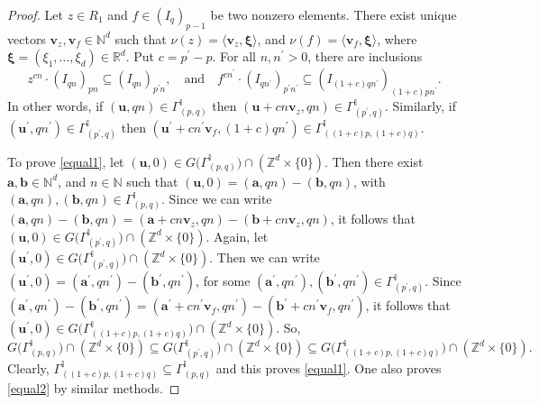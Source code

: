 \documentclass[12pt,a4paper]{amsart}
\theoremstyle{plain}
\theoremstyle{definition}
\numberwithin{equation}{theorem}
\begin{document}
\begin{proof}
Let $z\in R_1$ and $f\in {\left(I_{q}\right)}_{p-1}$ be two nonzero elements. There exist unique vectors $\mathbf{v}_z, \mathbf{v}_f \in \mathbb{N}^d$ such that $\nu(z) = \langle \mathbf{v}_z, \boldsymbol{\xi}\rangle$, and $\nu(f) = \langle \mathbf{v}_f, \boldsymbol{\xi}\rangle$, where $\boldsymbol{\xi}=(\xi_1,\ldots,\xi_d)\in \mathbb{R}^d$. Put $c=p^{\prime}-p$. For all $n,n^{\prime}>0$, there are inclusions $$z^{cn}\cdot {\left(I_{qn}\right)}_{pn} \subseteq {\left(I_{qn}\right)}_{p^{\prime}n}, \quad \text{and} \quad f^{cn^{\prime}}\cdot {\left(I_{qn^{\prime}}\right)}_{p^{\prime}n^{\prime}} \subseteq {\left(I_{(1+c)qn^{\prime}}\right)}_{(1+c)pn^{\prime}}.$$ In other words, if $(\mathbf{u},qn)\in \Gamma^{\mathbb{I}}_{(p,q)}$ then $(\mathbf{u}+cn\mathbf{v}_z,qn)\in \Gamma^{\mathbb{I}}_{(p^{\prime},q)}$. Similarly, if $(\mathbf{u}^{\prime},qn^{\prime})\in \Gamma^{\mathbb{I}}_{(p^{\prime},q)}$ then $(\mathbf{u}^{\prime}+cn^{\prime}\mathbf{v}_f,(1+c)qn^{\prime})\in \Gamma^{\mathbb{I}}_{\left((1+c)p,(1+c)q\right)}$.

To prove \eqref{equal1}, let $\left(\mathbf{u},0\right) \in G\big(\Gamma^{\mathbb{I}}_{(p,q)}\big) \cap \left(\mathbb{Z}^d\times \{0\}\right)$. Then there exist $\mathbf{a},\mathbf{b}\in \mathbb{N}^d$, and $n\in\mathbb{N}$ such that $\left(\mathbf{u},0\right) = (\mathbf{a},qn) - (\mathbf{b},qn)$, with $(\mathbf{a},qn), (\mathbf{b},qn) \in \Gamma^{\mathbb{I}}_{(p,q)}$. Since we can write $(\mathbf{a},qn) - (\mathbf{b},qn) = (\mathbf{a}+cn\mathbf{v}_z,qn) - (\mathbf{b}+cn\mathbf{v}_z,qn)$, it follows that $\left(\mathbf{u},0\right) \in G\big(\Gamma^{\mathbb{I}}_{(p^{\prime},q)}\big) \cap \left(\mathbb{Z}^d\times \{0\}\right)$. Again, let $\left(\mathbf{u}^{\prime},0\right) \in G\big(\Gamma^{\mathbb{I}}_{(p^{\prime},q)}\big) \cap \left(\mathbb{Z}^d\times \{0\}\right)$. Then we can write $\left(\mathbf{u}^{\prime},0\right) = (\mathbf{a}^{\prime},qn^{\prime}) - (\mathbf{b}^{\prime},qn^{\prime})$, for some $(\mathbf{a}^{\prime},qn^{\prime}), (\mathbf{b}^{\prime},qn^{\prime}) \in \Gamma^{\mathbb{I}}_{(p^{\prime},q)}$. Since $(\mathbf{a}^{\prime},qn^{\prime}) - (\mathbf{b}^{\prime},qn^{\prime}) = (\mathbf{a}^{\prime}+cn^{\prime}\mathbf{v}_f,qn^{\prime}) - (\mathbf{b}^{\prime}+cn^{\prime}\mathbf{v}_f,qn^{\prime})$, it follows that $\left(\mathbf{u}^{\prime},0\right) \in G\big(\Gamma^{\mathbb{I}}_{((1+c)p,(1+c)q)}\big)\cap \left(\mathbb{Z}^d\times \{0\}\right)$. So, $$G\big(\Gamma^{\mathbb{I}}_{(p,q)}\big) \cap \left(\mathbb{Z}^d\times \{0\}\right) \subseteq G\big(\Gamma^{\mathbb{I}}_{(p^{\prime},q)}\big) \cap \left(\mathbb{Z}^d\times \{0\}\right) \subseteq G\big(\Gamma^{\mathbb{I}}_{((1+c)p,(1+c)q)}\big) \cap \left(\mathbb{Z}^d\times \{0\}\right).$$ Clearly, $\Gamma^{\mathbb{I}}_{((1+c)p,(1+c)q)} \subseteq \Gamma^{\mathbb{I}}_{(p,q)}$ and this proves \eqref{equal1}. One also proves \eqref{equal2} by similar methods.


\end{proof}
\end{document}
